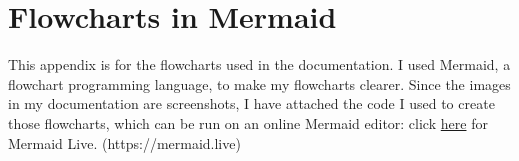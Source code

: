 \chapter{Flowcharts in Mermaid}

This appendix is for the flowcharts used in the documentation. I used Mermaid, a flowchart programming language, to make my flowcharts clearer. Since the images in my documentation are screenshots, I have attached the code I used to create those flowcharts, which can be run on an online Mermaid editor: click {\href{https://mermaid.live}{here} for Mermaid Live. (https://mermaid.live)}
